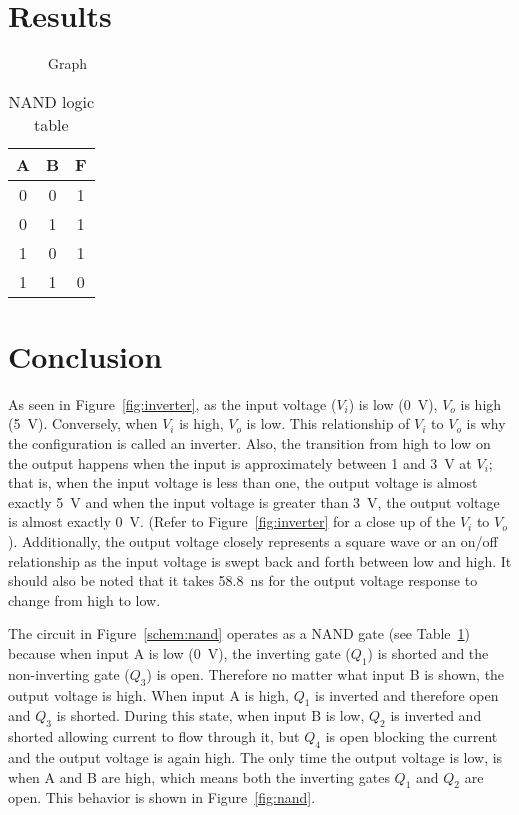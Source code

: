 \newpage

\section{Results}
\label{sec:results}

\begin{figure}[hbtp]
  \centering
  \resizebox{1.0\textwidth}{!}{}
  \caption{\label{fig:graph} Graph}
\end{figure}

\begin{table}[hbtp]
  \centering
  \begin{tabular}{cc|c}
    A & B & F \\
    \hline
    0 & 0 & 1 \\
    0 & 1 & 1 \\
    1 & 0 & 1 \\
    1 & 1 & 0 \\
  \end{tabular}
  \caption{\label{tab:nand} NAND logic table}
\end{table}

\section{Conclusion}
\label{sec:conclusion}

As seen in Figure~\ref{fig:inverter}, as the input voltage ($V_i$) is low (\SI{0}{V}), $V_o$ is high (\SI{5}{V}).  Conversely, when $V_i$ is high, $V_o$ is low. This relationship of $V_i$ to $V_o$ is why the configuration is called an inverter.  Also, the transition from high to low on the output happens when the input is approximately between 1 and \SI{3}{V} at $V_i$; that is, when the input voltage is less than one, the output voltage is almost exactly \SI{5}{V} and when the input voltage is greater than \SI{3}{V}, the output voltage is almost exactly \SI{0}{V}.  (Refer to Figure~\ref{fig:inverter} for a close up of the $V_i$ to $V_o$).  Additionally, the output voltage closely represents a square wave or an on/off relationship as the input voltage is swept back and forth between low and high.  It should also be noted that it takes \SI{58.8}{\nano\second} for the output voltage response to change from high to low.

The circuit in Figure~\ref{schem:nand} operates as a NAND gate (see Table~\ref{tab:nand}) because when input A is low (\SI{0}{V}), the inverting gate ($Q_1$) is shorted and the non-inverting gate ($Q_3$) is open.  Therefore no matter what input B is shown, the output voltage is high.  When input A is high, $Q_1$ is inverted and therefore open and $Q_3$ is shorted. During this state, when input B is low, $Q_2$ is inverted and shorted allowing current to flow through it, but $Q_4$ is open blocking the current and the output voltage is again high.  The only time the output voltage is low, is when A and B are high, which means both the inverting gates $Q_1$ and $Q_2$ are open.  This behavior is shown in Figure~\ref{fig:nand}.

